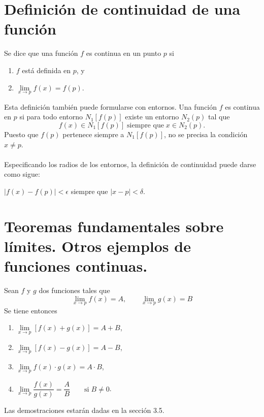 \section{Definición de continuidad de una función}

\begin{tcolorbox}
    \begin{def.}
	Se dice que una función $f$ es continua en un punto $p$ si 
	\begin{enumerate}[\bfseries a)]
	    \item $f$ está definida en $p$, y
	    \item $\lim\limits_{x\to p}f(x)=f(p)$.
	\end{enumerate}
	Esta definición también puede formularse con entornos. Una función $f$ es continua en $p$ si para todo entorno $N_1[f(p)]$ existe un entorno $N_2(p)$ tal que 
	$$f(x)\in N_1[f(p)]\; \mbox{siempre que}\; x \in N_2(p).$$
	Puesto que $f(p)$ pertenece siempre a $N_1[f(p)]$, no se precisa la condición $x\neq p$.\\\\
	Especificando los radios de los entornos, la definición de continuidad puede darse como sigue:
	\begin{center}
	    $|f(x)-f(p)|<\epsilon$ siempre que $|x-p|<\delta$.
	\end{center}
    \end{def.}
\end{tcolorbox}

\section{Teoremas fundamentales sobre límites. Otros ejemplos de funciones continuas.}

\begin{tcolorbox}
    \begin{teo}
	Sean $f$ y $g$ dos funciones tales que 
	$$\lim_{x\to p} f(x)=A,\qquad \lim_{x\to p}g(x)=B$$
	Se tiene entonces
	\begin{enumerate}[\bfseries (i)]
	    \item $\lim\limits_{x\to p} [f(x)+g(x)]=A+B$,
	    \item $\lim\limits_{x\to p} [f(x)-g(x)]=A-B$,
	    \item $\lim\limits_{x\to p} f(x)\cdot g(x) = A\cdot B$,
	    \item $\lim\limits_{x\to p} \dfrac{f(x)}{g(x)} = \dfrac{A}{B}\qquad \mbox{si}\; B\neq 0$.\\
	\end{enumerate}
	Las demostraciones estarán dadas en la sección 3.5.
    \end{teo}
\end{tcolorbox}


